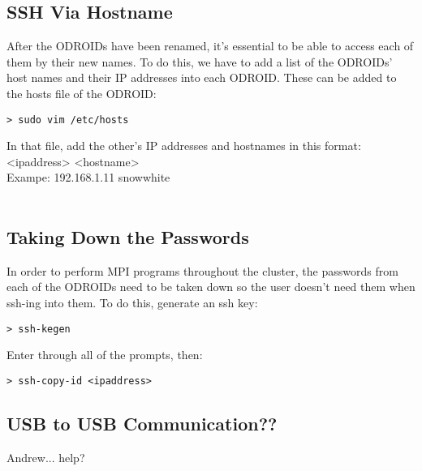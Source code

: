 \subsection{SSH Via Hostname}
After the ODROIDs have been renamed, it's essential to be able to access each of them by their new names. To do this, we have to add a list of the ODROIDs' host names and their IP addresses into each ODROID. These can be added to the hosts file of the ODROID:
\begin{lstlisting}
> sudo vim /etc/hosts
\end{lstlisting}
In that file, add the other's IP addresses and hostnames in this format: \\
<ipaddress> <hostname> \\
Exampe: 192.168.1.11 snow\textunderscore white \\ \\

\subsection{Taking Down the Passwords}
In order to perform MPI programs throughout the cluster, the passwords from each of the ODROIDs need to be taken down so the user doesn't need them when ssh-ing into them. To do this, generate an ssh key:
\begin{lstlisting}
> ssh-kegen
\end{lstlisting}
Enter through all of the prompts, then:
\begin{lstlisting}
> ssh-copy-id <ipaddress>
\end{lstlisting}

\subsection{USB to USB Communication??}
Andrew... help?

